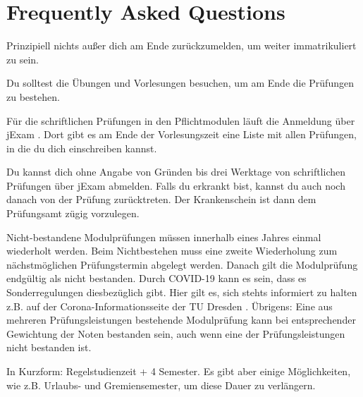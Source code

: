 \newcommand{\fancypageref}[1] {%
    \changemenucolor{gray}{br}{named}{ese_bg_color}%
    \changemenucolor{gray}{txt}{named}{ese_bg_color}%
    \keys{Seite \pageref{#1}}%
    \changemenucolor{gray}{br}{named}{ese_bg_color}%
    \changemenucolor{gray}{txt}{named}{ese_bg_color}%
}

\chapter*{Frequently Asked Questions}
\label{sec:faq}
Prinzipiell nichts außer dich am Ende zurückzumelden, um weiter immatrikuliert zu sein.

Du solltest die Übungen und Vorlesungen besuchen, um am Ende die Prüfungen zu bestehen.

Für die schriftlichen Prüfungen in den Pflichtmodulen läuft die Anmeldung über jExam .
Dort gibt es am Ende der Vorlesungszeit eine Liste mit allen Prüfungen, in die du dich einschreiben kannst.

Du kannst dich ohne Angabe von Gründen bis drei Werktage von schriftlichen Prüfungen über jExam abmelden. Falls du erkrankt bist, kannst du auch noch danach von der Prüfung zurücktreten. Der Krankenschein ist dann dem Prüfungsamt zügig vorzulegen.

Nicht-bestandene Modulprüfungen müssen innerhalb eines Jahres einmal wiederholt werden. Beim Nichtbestehen muss eine zweite Wiederholung zum nächstmöglichen Prüfungstermin abgelegt werden. Danach gilt die Modulprüfung endgültig als nicht bestanden. 
Durch COVID-19 kann es sein, dass es Sonderregulungen diesbezüglich gibt. Hier gilt es, sich stehts informiert zu halten z.B. auf der Corona-Informationsseite der TU Dresden . 
Übrigens: Eine aus mehreren Prüfungsleistungen bestehende Modulprüfung kann bei entsprechender Gewichtung der Noten bestanden sein, auch wenn eine der Prüfungsleistungen nicht bestanden ist.

In Kurzform: Regelstudienzeit + 4 Semester. Es gibt aber einige Möglichkeiten, wie z.B. Urlaubs- und Gremiensemester, um diese Dauer zu verlängern.

